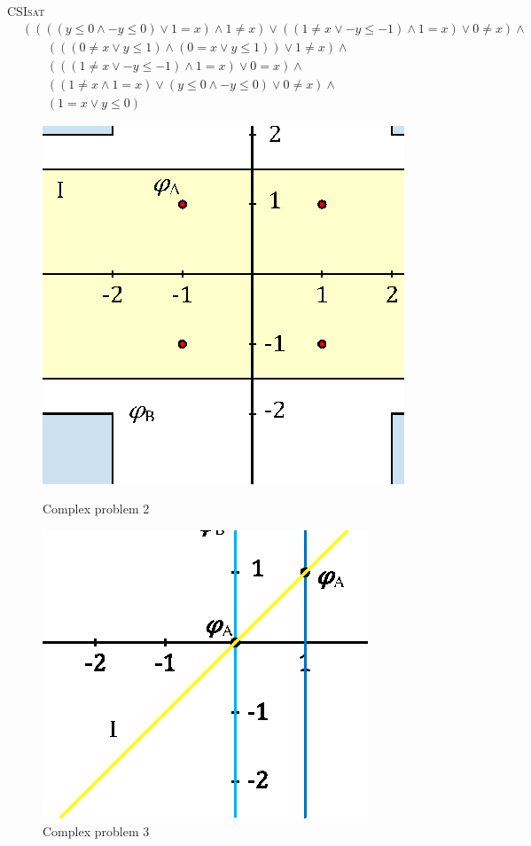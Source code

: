 \begin{itemize}
\textsc{CSIsat}
\begin{align*}
& ((((y \leq 0 \wedge -y \leq 0) \vee 1 = x) \wedge 1 \neq x) \vee ((1 \neq x \vee -y \leq -1) \wedge 1 = x) \vee 0 \neq x) \wedge \\
& \qquad (((0 \neq x \vee y \leq 1) \wedge (0 = x \vee y \leq 1)) \vee 1 \neq x) \wedge \\
& \qquad (((1 \neq x \vee -y \leq -1) \wedge 1 = x) \vee 0 = x) \wedge \\
& \qquad ((1 \neq x \wedge 1 = x) \vee (y \leq 0 \wedge -y \leq 0) \vee 0 \neq x) \wedge \\
& \qquad (1 = x \vee y \leq 0)
\end{align*}

\end{itemize}

\begin{figure}[htb]
  \begin{minipage}[t]{.47\textwidth}
  \centering
  \includegraphics[scale=1.1]{figures/int2.eps}
  \caption{Complex problem 2}
  \label{fig:int2}
  \end{minipage}
  \hfill
  \begin{minipage}[t]{.47\textwidth}
  \centering
  \includegraphics[scale=1.1]{figures/int3.eps}
  \caption{Complex problem 3}
  \label{fig:int3}
  \end{minipage}
\end{figure}


